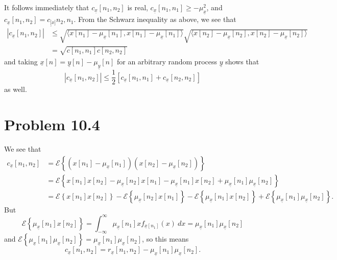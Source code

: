 \documentclass{article}
\begin{document}
It follows immediately that $c_{\underline{x}}[n_1,n_2]$ is real,
$c_{\underline{x}}[n_1,n_1] \geq -\mu_{\underline{x}}^2$, and
$c_{\underline{x}}[n_1,n_2] = c_{\underline[x]}{n_2,n_1}$. From the Schwarz
inequality as above, we see that
\begin{align*}
|c_{\underline{x}}[n_1,n_2]| &\leq 
  \sqrt{
   \langle x[n_1] - \mu_{\underline{x}}[n_1], 
           x[n_1] - \mu_{\underline{x}}[n_1]\rangle}
  \sqrt{
   \langle x[n_2] - \mu_{\underline{x}}[n_2], 
           x[n_2] - \mu_{\underline{x}}[n_2]\rangle}\\
   &= \sqrt{c[n_1,n_1]c[n_2,n_2]}
\end{align*}
and taking $\underline{x}[n] = \underline{y}[n] - \mu_{\underline{y}}[n]$ 
for an arbitrary random process $\underline{y}$ shows that
$$
|c_{\underline{x}}[n_1,n_2]| 
  \leq \frac{1}{2}[c_{\underline{x}}[n_1,n_1] 
                +  c_{\underline{x}}[n_2,n_2]]
$$
as well.

\section*{Problem 10.4}
We see that
\begin{align*}
c_{\underline{x}}[n_1, n_2] 
  &= \mathcal{E}\left\{
     (x[n_1] - \mu_{\underline{x}}[n_1])
     (x[n_2] - \mu_{\underline{x}}[n_2])\right\} \\
  &= \mathcal{E}\left\{
     x[n_1]x[n_2] 
   - \mu_{\underline{x}}[n_2]x[n_1]
   - \mu_{\underline{x}}[n_1]x[n_2]
   + \mu_{\underline{x}}[n_1]\mu_{\underline{x}}[n_2]\right\} \\
  &= \mathcal{E}\left\{x[n_1]x[n_2]\right\}
   - \mathcal{E}\left\{\mu_{\underline{x}}[n_2]x[n_1]\right\}
   - \mathcal{E}\left\{\mu_{\underline{x}}[n_1]x[n_2]\right\}
   + \mathcal{E}\left\{
       \mu_{\underline{x}}[n_1]\mu_{\underline{x}}[n_2]\right\}.
\end{align*}
But
$$
\mathcal{E}\left\{\mu_{\underline{x}}[n_1]x[n_2]\right\} =
\int_{-\infty}^{\infty} \mu_{\underline{x}}[n_1] 
                        x f_{\underline{x}[n_1]}(x) ~dx =
  \mu_{\underline{x}}[n_1]\mu_{\underline{x}}[n_2]
$$
and $\mathcal{E}\left\{\mu_{\underline{x}}[n_1]
                       \mu_{\underline{x}}[n_2]\right\}
     = \mu_{\underline{x}}[n_1]\mu_{\underline{x}}[n_2]$, so this means
$$
c_{\underline{x}}[n_1, n_2] 
 = r_{\underline{x}}[n_1,n_2]
 - \mu_{\underline{x}}[n_1]
   \mu_{\underline{x}}[n_2].
$$
\end{document}
